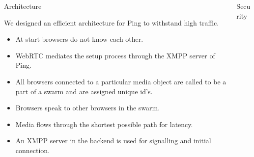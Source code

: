 \documentclass[final]{beamer}
\newlength{\onecolwid}
\newlength{\twocolwid}
\begin{document}
\begin{frame}[t]
\begin{columns}[t]
\begin{column}{\twocolwid}
\begin{columns}[t,totalwidth=\twocolwid] %

\begin{column}{\onecolwid}\vspace{-.6in} %


\begin{block}{Architecture}

We designed an efficient architecture for Ping to withstand high traffic.

\begin{itemize}
\item At start browsers do not know each other.
\item WebRTC mediates the setup process through the XMPP server of Ping.
\item All browsers connected to a particular media object are called to be a part of a swarm and are assigned unique id's.
\item Browsers speak to other browsers in the swarm.
\item Media flows through the shortest possible path for latency.
\item An XMPP server in the backend is used for signalling and initial connection.
\end{itemize}



\end{block}


\end{column} %

\begin{column}{\onecolwid}\vspace{-.6in} %


\begin{block}{Security}


\end{block}
\end{column}
\end{columns}
\end{column}
\end{columns}
\end{frame}
\end{document}

